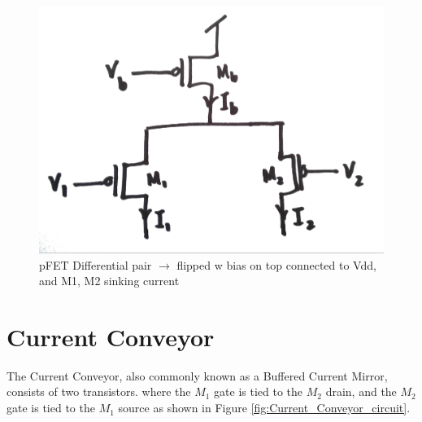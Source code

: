 \begin{figure}[htbp]
  \centering
  \includegraphics[scale=0.2]{pics/pFET_Differential_pair_circuit.png}
  \caption{pFET Differential pair $\rightarrow$ flipped w bias on top connected to Vdd, and M1, M2 sinking current}
  \label{fig:pFET_Differential_pair_circuit}
\end{figure}



\section{Current Conveyor}
The Current Conveyor, also commonly known as a Buffered Current Mirror, consists of two transistors. where the $M_1$ gate is tied to the $M_2$ drain, and the $M_2$ gate is tied to the $M_1$ source as shown in Figure \ref{fig:Current_Conveyor_circuit}.

